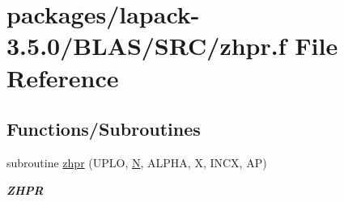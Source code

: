 \hypertarget{lapack-3_85_80_2BLAS_2SRC_2zhpr_8f}{}\section{packages/lapack-\/3.5.0/\+B\+L\+A\+S/\+S\+R\+C/zhpr.f File Reference}
\label{lapack-3_85_80_2BLAS_2SRC_2zhpr_8f}
\subsection*{Functions/\+Subroutines}
\begin{DoxyCompactItemize}
\item 
subroutine \hyperlink{group__complex16__blas__level2_ga449f8a34be469eab7caf327caa086711}{zhpr} (U\+P\+L\+O, \hyperlink{polmisc_8c_a0240ac851181b84ac374872dc5434ee4}{N}, A\+L\+P\+H\+A, X, I\+N\+C\+X, A\+P)
\begin{DoxyCompactList}\small\item\em {\bfseries Z\+H\+P\+R} \end{DoxyCompactList}\end{DoxyCompactItemize}
